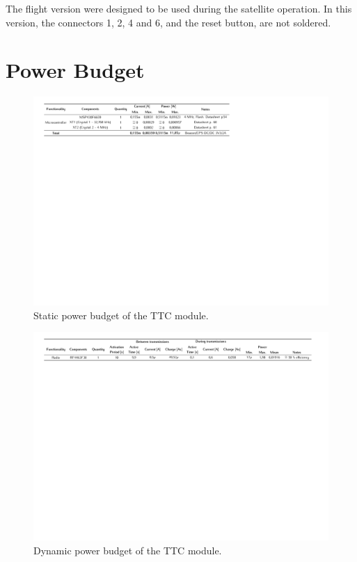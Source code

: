 \documentclass[12pt]{book}
\begin{document}
The flight version were designed to be used during the satellite operation. In this version, the connectors 1, 2, 4 and 6, and the reset button, are not soldered.

\section{Power Budget}

\begin{figure}[!h]
	\begin{center}
		\includegraphics[width=\textwidth]{figures/power_budget_static.pdf}
		\caption{Static power budget of the TTC module.}
		\label{fig:power-budget-static}
	\end{center}
\end{figure}

\begin{figure}[!h]
	\begin{center}
		\includegraphics[width=\textwidth]{figures/power_budget_dynamic.pdf}
		\caption{Dynamic power budget of the TTC module.}
		\label{fig:power-budget-dynamic}
	\end{center}
\end{figure}
\end{document}
